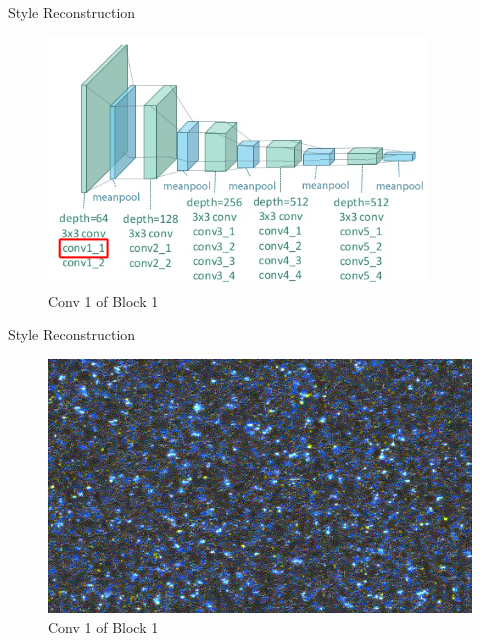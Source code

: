 \documentclass{beamer}
\begin{document}
\begin{frame}{Style Reconstruction}
\begin{figure}[ht]
\centering
\caption{Conv 1 of Block 1}
\includegraphics[width=0.9\textwidth]{img/vgg19/style/block1_conv1}
\end{figure}
\end{frame}
\begin{frame}{Style Reconstruction}
\begin{figure}[ht]
\centering
\caption{Conv 1 of Block 1}
\includegraphics[width=\textwidth]{img/style/block1_conv1.png}
\end{figure}
\end{frame}
\end{document}
